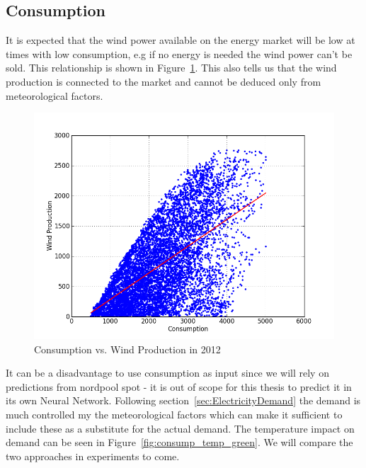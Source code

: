 \subsection{Consumption}
\label{sec:consumptionWindProduction}
It is expected that the wind power available on the energy market will be low at times with low consumption, e.g if no energy is needed the wind power can't be sold.  This relationship is shown in Figure~\ref{fig:consumptionVsWindProduction}. This also tells us that the wind production is connected to the market and cannot be deduced only from meteorological factors.

\begin{figure}[H]
\centering
\includegraphics[width=0.99\linewidth,natwidth=898,natheight=587]{billeder/consumptionVsWindProduction.png}
\caption{Consumption vs. Wind Production in 2012}
\label{fig:consumptionVsWindProduction}
\end{figure}

It can be a disadvantage to use consumption as input since we will rely on predictions from nordpool spot - it is out of scope for this thesis to predict it in its own Neural Network. Following section~\ref{sec:ElectricityDemand} the demand is much controlled my the meteorological factors which can make it sufficient to include these as a substitute for the actual demand. The temperature impact on demand can be seen in Figure~\ref{fig:consump_temp_green}. We will compare the two approaches in experiments to come.

